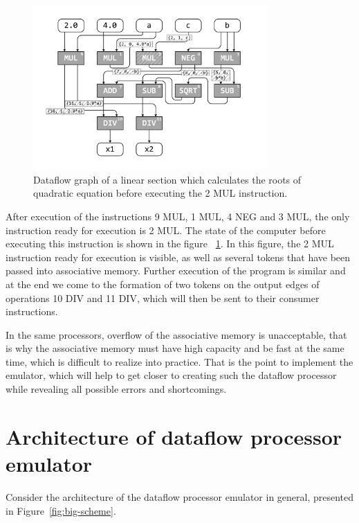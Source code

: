 \documentclass[
11pt,%
tightenlines,%
twoside,%
onecolumn,%
nofloats,%
nobibnotes,%
nofootinbib,%
superscriptaddress,%
noshowpacs,%
centertags]%
{revtex4}
\begin{document}
\begin{figure}[h]
\setcaptionmargin{5mm}
\onelinecaptionsfalse %
\includegraphics[width=0.80\textwidth]{pics/dataflow2.pdf}
\caption{Dataflow graph of a linear section which calculates the roots of quadratic equation before executing the 2 MUL instruction.}\label{fig:dataflow2}
\end{figure}

After execution of the instructions 9 MUL, 1 MUL, 4 NEG and 3 MUL, the only instruction ready for execution is 2 MUL.
The state of the computer before executing this instruction is shown in the figure ~\ref{fig:dataflow2}.
In this figure, the 2 MUL instruction ready for execution is visible, as well as several tokens that have been passed into associative memory.
Further execution of the program is similar and at the end we come to the formation of two tokens on the output edges of operations 10 DIV and 11 DIV, which will then be sent to their consumer instructions.

In the same processors, overflow of the associative memory is unacceptable, that is why the associative memory must have high capacity and be fast at the same time, which is difficult to realize into practice.
That is the point to implement the emulator, which will help to get closer to creating such the dataflow processor while revealing all possible errors and shortcomings.

\section{Architecture of dataflow processor emulator}

Consider the architecture of the dataflow processor emulator in general, presented in Figure~\ref{fig:big-scheme}.
\end{document}
